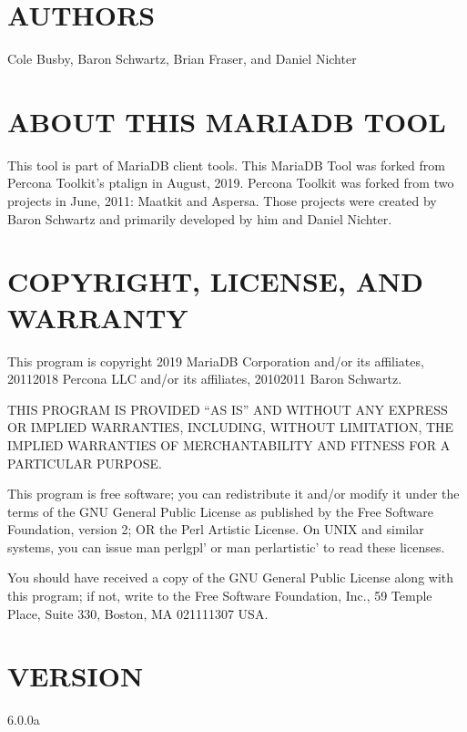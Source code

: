 \documentclass[letterpaper,10pt,english]{sphinxmanual}
\begin{document}
\section{AUTHORS}
\label{\detokenize{mariadb-index-checker:authors}}
\sphinxAtStartPar
Cole Busby, Baron Schwartz, Brian Fraser, and Daniel Nichter


\section{ABOUT THIS MARIADB TOOL}
\label{\detokenize{mariadb-index-checker:about-this-mariadb-tool}}
\sphinxAtStartPar
This tool is part of MariaDB client tools. This MariaDB Tool was forked from
Percona Toolkit’s pt\sphinxhyphen{}align in August, 2019. Percona Toolkit was forked from two
projects in June, 2011: Maatkit and Aspersa.  Those projects were created by
Baron Schwartz and primarily developed by him and Daniel Nichter.


\section{COPYRIGHT, LICENSE, AND WARRANTY}
\label{\detokenize{mariadb-index-checker:copyright-license-and-warranty}}
\sphinxAtStartPar
This program is copyright 2019 MariaDB Corporation and/or its affiliates,
2011\sphinxhyphen{}2018 Percona LLC and/or its affiliates, 2010\sphinxhyphen{}2011 Baron Schwartz.

\sphinxAtStartPar
THIS PROGRAM IS PROVIDED “AS IS” AND WITHOUT ANY EXPRESS OR IMPLIED
WARRANTIES, INCLUDING, WITHOUT LIMITATION, THE IMPLIED WARRANTIES OF
MERCHANTABILITY AND FITNESS FOR A PARTICULAR PURPOSE.

\sphinxAtStartPar
This program is free software; you can redistribute it and/or modify it under
the terms of the GNU General Public License as published by the Free Software
Foundation, version 2; OR the Perl Artistic License.  On UNIX and similar
systems, you can issue \textasciigrave{}man perlgpl’ or \textasciigrave{}man perlartistic’ to read these
licenses.

\sphinxAtStartPar
You should have received a copy of the GNU General Public License along with
this program; if not, write to the Free Software Foundation, Inc., 59 Temple
Place, Suite 330, Boston, MA  02111\sphinxhyphen{}1307  USA.


\section{VERSION}
\label{\detokenize{mariadb-index-checker:version}}
\sphinxAtStartPar
{} 6.0.0a
\end{document}
